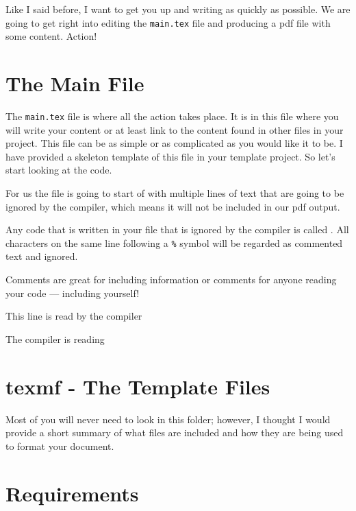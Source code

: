 Like I said before, I want to get you up and writing as quickly as possible.
We are going to get right into editing the \texttt{main.tex} file and producing
a pdf file with some content.  Action!

\section{The Main File}
The \texttt{main.tex} file is where all the action takes place.  It is in this
file where you will write your content or at least link to the content found in
other files in your project.  This file can be as simple or as complicated as 
you would like it to be.  I have provided a skeleton template of this file in
your template project.  So let's start looking at the code.

For us the file is going to start of with multiple lines of text that are going
to be ignored by the compiler, which means it will not be included in our pdf
output.
\begin{definition}
  Any code that is written in your file that is ignored by the compiler is
  called .  All characters on the same line following
  a \verb!%! symbol will be regarded as commented text and ignored.
\end{definition}

Comments are great for including information or comments for anyone reading
your code --- including yourself!
\begin{mhotexbox}
This line is read by the compiler

The compiler is reading %
\end{mhotexbox}
\section{texmf - The Template Files}

Most of you will never need to look in this folder; however, I thought I would
provide a short summary of what files are included and how they are being used
to format your document.

\section{Requirements}

